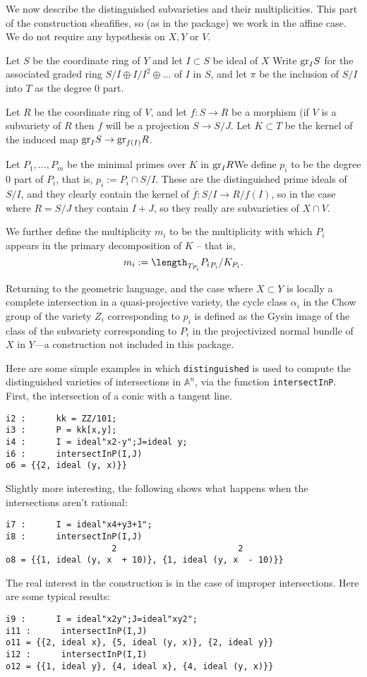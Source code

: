 \documentclass[twoside,12pt, leqno]{amsart}
\def\gr{{\rm gr}}
\begin{document}
We now describe the distinguished subvarieties and their multiplicities. This part of the construction sheafifies, so (as in the package) we work in the affine case. We do not require any hypothesis on $X, Y$ or $V$. 

Let $S$ be the coordinate ring of $Y$ and let $I\subset S$ be  ideal of $X$
Write
$
\gr_{I}S
$ for the associated graded ring $S/I\oplus I/I^{2}\oplus\dots$ of $I$ in $S$, and let
$\pi$ be the inclusion of $S/I$ into $T$ as the degree 0 part.

Let $R$ be the coordinate ring of $V$, and let $f:S\to R$ be a morphism (if $V$ is a subvariety of $R$ then $f$ will be a projection  $S\to S/J$. Let $K\subset T$ be the kernel of the induced map $ \gr_{I}S \to \gr_{f(I)}R$.  

Let $P_{1},\dots, P_{m}$ be the minimal primes over $K$ in $\gr_{I}R$We define $p_{i}$ to be the degree 0 part of $P_{i}$, that is, $p_{i} := P_{i}\cap S/I$. These are the distinguished prime ideals of $S/I$, and they clearly contain the kernel of $\overline f: S/I \to R/f(I)$, so in the case where $R = S/J$ they contain $I+J$, so they really are subvarieties
of $X\cap V$.

We further define the multiplicity $m_{i}$ to be the multiplicity with which $P_{i}$ appears in the primary decomposition of $K$ -- that is,
$$
m_{i} := \length_{T_{P_{i}}}{P_{i}}_{P_{i}}/K_{P_{i}}.
$$

Returning to the geometric language, and the case where $X\subset Y$ is locally a complete intersection in a quasi-projective variety, the cycle class $\alpha_{i}$ in the Chow group of the variety 
$Z_{i}$ corresponding to $p_{i}$ is defined as the Gysin image of the class of the subvariety corresponding
to $P_{i}$ in the projectivized normal bundle of $X$ in $Y$---a construction not included in this package. 

Here are some simple examples in which {\tt distinguished} is used to compute the distinguished varieties of
intersections in ${\mathbb A}^{n}$, via the function {\tt intersectInP}. First, the intersection of a conic with a tangent line.
\begin{verbatim}
i2 :      kk = ZZ/101;
i3 :      P = kk[x,y];
i4 :      I = ideal"x2-y";J=ideal y;
i6 :      intersectInP(I,J)
o6 = {{2, ideal (y, x)}}
\end{verbatim}
Slightly more interesting, the following shows what happens when the intersections aren't rational:
\begin{verbatim}
i7 :      I = ideal"x4+y3+1";
i8 :      intersectInP(I,J)
                     2                        2
o8 = {{1, ideal (y, x  + 10)}, {1, ideal (y, x  - 10)}}
\end{verbatim}
The real interest in the construction is in the case of improper intersections. Here are some typical results:
\begin{verbatim}
i9 :      I = ideal"x2y";J=ideal"xy2";
i11 :      intersectInP(I,J)
o11 = {{2, ideal x}, {5, ideal (y, x)}, {2, ideal y}}
i12 :      intersectInP(I,I)
o12 = {{1, ideal y}, {4, ideal x}, {4, ideal (y, x)}}
\end{verbatim}
\end{document}
